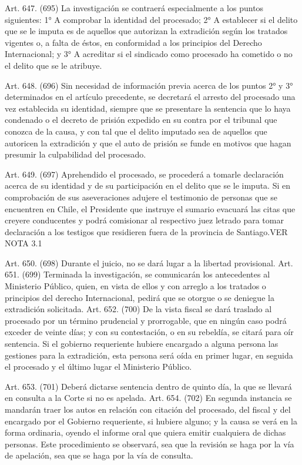     Art. 647. (695) La investigación se contraerá especialmente a los puntos siguientes:
    1° A comprobar la identidad del procesado;
    2° A establecer si el delito que se le imputa es de aquellos que autorizan la extradición según los tratados vigentes o, a falta de éstos, en conformidad a los principios del Derecho Internacional; y
    3° A acreditar si el sindicado como procesado ha cometido o no el delito que se le atribuye.


    Art. 648. (696) Sin necesidad de información previa acerca de los puntos 2° y 3° determinados en el artículo precedente, se decretará el arresto del procesado una vez  establecida su identidad, siempre que se presentare la sentencia que lo haya condenado o el decreto de prisión expedido en su contra por el tribunal que conozca de la causa, y con tal que el delito imputado sea de aquellos que autoricen la extradición y que el auto de prisión se funde en motivos que hagan presumir la culpabilidad del procesado.


    Art. 649. (697) Aprehendido el procesado, se procederá a tomarle declaración acerca de su identidad y de su participación en el delito que se le imputa. Si en comprobación de sus aseveraciones adujere el testimonio de personas que se encuentren en Chile, el Presidente que instruye el sumario evacuará las citas que creyere conducentes y podrá comisionar al respectivo juez letrado para tomar declaración a los testigos que residieren fuera de la provincia de Santiago.VER NOTA 3.1


    Art. 650. (698) Durante el juicio, no se dará lugar a la libertad provisional.
    Art. 651. (699) Terminada la investigación, se comunicarán los antecedentes al Ministerio Público, quien, en vista de ellos y con arreglo a los tratados o principios del derecho Internacional, pedirá que se otorgue o se deniegue la extradición solicitada.
    Art. 652. (700) De la vista fiscal se dará traslado al procesado por un término prudencial y prorrogable, que en ningún caso podrá exceder de veinte días; y con su contestación, o en su rebeldía, se citará para oír sentencia.
    Si el gobierno requeriente hubiere encargado a alguna persona las gestiones para la extradición, esta persona será oída en primer lugar, en seguida el procesado y el último lugar el Ministerio Público.

    Art. 653. (701) Deberá dictarse sentencia dentro de quinto día, la que se llevará en consulta a la Corte si no es apelada.
    Art. 654. (702) En segunda instancia se mandarán traer los autos en relación con citación del procesado, del fiscal y del encargado por el Gobierno requeriente, si hubiere alguno; y la causa se verá en la forma ordinaria, oyendo el informe oral que quiera emitir cualquiera de dichas personas. Este procedimiento se observará, sea que la revisión se haga por la vía de apelación, sea que se haga por la vía de consulta.

